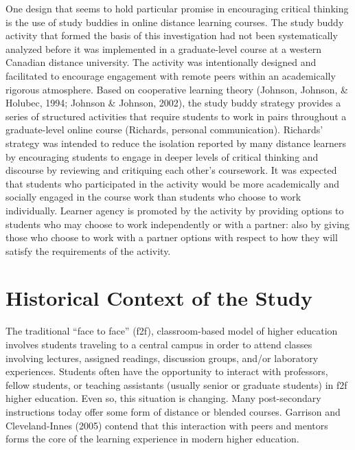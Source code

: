 \documentclass[
]{book}
\theoremstyle{definition}
\theoremstyle{definition}
\theoremstyle{definition}
\theoremstyle{definition}
\theoremstyle{remark}
\begin{document}
One design that seems to hold particular promise in encouraging critical thinking is the use of study buddies in online distance learning courses. The study buddy activity that formed the basis of this investigation had not been systematically analyzed before it was implemented in a graduate-level course at a western Canadian distance university. The activity was intentionally designed and facilitated to encourage engagement with remote peers within an academically rigorous atmosphere. Based on cooperative learning theory (Johnson, Johnson, \& Holubec, 1994; Johnson \& Johnson, 2002), the study buddy strategy provides a series of structured activities that require students to work in pairs throughout a graduate-level online course (Richards, personal communication). Richards' strategy was intended to reduce the isolation reported by many distance learners by encouraging students to engage in deeper levels of critical thinking and discourse by reviewing and critiquing each other's coursework. It was expected that students who participated in the activity would be more academically and socially engaged in the course work than students who choose to work individually. Learner agency is promoted by the activity by providing options to students who may choose to work independently or with a partner: also by giving those who choose to work with a partner options with respect to how they will satisfy the requirements of the activity.

\hypertarget{historical-context-of-the-study}{%
\section*{Historical Context of the Study}\label{historical-context-of-the-study}}

The traditional ``face to face'' (f2f), classroom-based model of higher education involves students traveling to a central campus in order to attend classes involving lectures, assigned readings, discussion groups, and/or laboratory experiences. Students often have the opportunity to interact with professors, fellow students, or teaching assistants (usually senior or graduate students) in f2f higher education. Even so, this situation is changing. Many post-secondary instructions today offer some form of distance or blended courses. Garrison and Cleveland-Innes (2005) contend that this interaction with peers and mentors forms the core of the learning experience in modern higher education.
\end{document}
